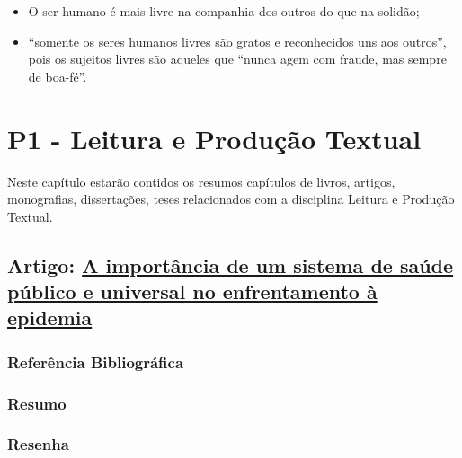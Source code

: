 \documentclass[
]{book}
\providecommand{\tightlist}{%
  \setlength{\itemsep}{0pt}\setlength{\parskip}{0pt}}
\begin{document}
\begin{itemize}
  \begin{itemize}
  \tightlist
  \item
    O ser humano é mais livre na companhia dos outros do que na solidão;
  \item
    ``somente os seres humanos livres são gratos e reconhecidos uns aos outros'', pois os sujeitos livres são aqueles que ``nunca agem com fraude, mas sempre de boa-fé''.
  \end{itemize}
\end{itemize}

\hypertarget{p1---leitura-e-produuxe7uxe3o-textual}{%
\chapter{P1 - Leitura e Produção Textual}\label{p1---leitura-e-produuxe7uxe3o-textual}}

Neste capítulo estarão contidos os resumos capítulos de livros, artigos, monografias, dissertações, teses relacionados com a disciplina Leitura e Produção Textual.

\hypertarget{artigo-a-importuxe2ncia-de-um-sistema-de-sauxfade-puxfablico-e-universal-no-enfrentamento-uxe0-epidemia}{%
\section{\texorpdfstring{Artigo: \href{https://www.epsjv.fiocruz.br/noticias/reportagem/a-importancia-de-um-sistema-de-saude-publico-e-universal-no-enfrentamento-a}{A importância de um sistema de saúde público e universal no enfrentamento à epidemia}}{Artigo: A importância de um sistema de saúde público e universal no enfrentamento à epidemia}}\label{artigo-a-importuxe2ncia-de-um-sistema-de-sauxfade-puxfablico-e-universal-no-enfrentamento-uxe0-epidemia}}

\hypertarget{referuxeancia-bibliogruxe1fica}{%
\subsection{Referência Bibliográfica}\label{referuxeancia-bibliogruxe1fica}}

\hypertarget{resumo}{%
\subsection{Resumo}\label{resumo}}

\hypertarget{resenha}{%
\subsection{Resenha}\label{resenha}}
\end{document}

